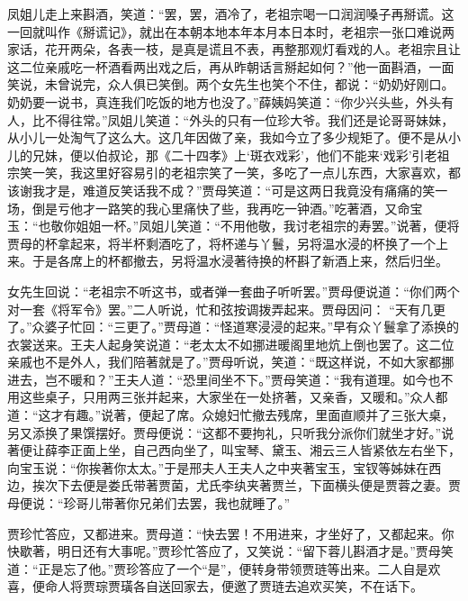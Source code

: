 \begin{parag}


    凤姐儿走上来斟酒，笑道：“罢，罢，酒冷了，老祖宗喝一口润润嗓子再掰谎。这一回就叫作《掰谎记》，就出在本朝本地本年本月本日本时，老祖宗一张口难说两家话，花开两朵，各表一枝，是真是谎且不表，再整那观灯看戏的人。老祖宗且让这二位亲戚吃一杯酒看两出戏之后，再从昨朝话言掰起如何？”他一面斟酒，一面笑说，未曾说完，众人俱已笑倒。两个女先生也笑个不住，都说：“奶奶好刚口。奶奶要一说书，真连我们吃饭的地方也没了。”薛姨妈笑道：“你少兴头些，外头有人，比不得往常。”凤姐儿笑道：“外头的只有一位珍大爷。我们还是论哥哥妹妹，从小儿一处淘气了这么大。这几年因做了亲，我如今立了多少规矩了。便不是从小儿的兄妹，便以伯叔论，那《二十四孝》上‘斑衣戏彩’，他们不能来‘戏彩’引老祖宗笑一笑，我这里好容易引的老祖宗笑了一笑，多吃了一点儿东西，大家喜欢，都该谢我才是，难道反笑话我不成？”贾母笑道：“可是这两日我竟没有痛痛的笑一场，倒是亏他才一路笑的我心里痛快了些，我再吃一钟酒。”吃著酒，又命宝玉：“也敬你姐姐一杯。”凤姐儿笑道：“不用他敬，我讨老祖宗的寿罢。”说著，便将贾母的杯拿起来，将半杯剩酒吃了，将杯递与丫鬟，另将温水浸的杯换了一个上来。于是各席上的杯都撤去，另将温水浸著待换的杯斟了新酒上来，然后归坐。
\end{parag}


\begin{parag}


    女先生回说：“老祖宗不听这书，或者弹一套曲子听听罢。”贾母便说道：“你们两个对一套《将军令》罢。”二人听说，忙和弦按调拨弄起来。贾母因问： “天有几更了。”众婆子忙回：“三更了。”贾母道：“怪道寒浸浸的起来。”早有众丫鬟拿了添换的衣裳送来。王夫人起身笑说道：“老太太不如挪进暖阁里地炕上倒也罢了。这二位亲戚也不是外人，我们陪著就是了。”贾母听说，笑道：“既这样说，不如大家都挪进去，岂不暖和？”王夫人道：“恐里间坐不下。”贾母笑道：“我有道理。如今也不用这些桌子，只用两三张并起来，大家坐在一处挤著，又亲香，又暖和。”众人都道：“这才有趣。”说著，便起了席。众媳妇忙撤去残席，里面直顺并了三张大桌，另又添换了果馔摆好。贾母便说：“这都不要拘礼，只听我分派你们就坐才好。”说著便让薛李正面上坐，自己西向坐了，叫宝琴、黛玉、湘云三人皆紧依左右坐下，向宝玉说：“你挨著你太太。”于是邢夫人王夫人之中夹著宝玉，宝钗等姊妹在西边，挨次下去便是娄氏带著贾菌，尤氏李纨夹著贾兰，下面横头便是贾蓉之妻。贾母便说：“珍哥儿带著你兄弟们去罢，我也就睡了。”
\end{parag}


\begin{parag}


    贾珍忙答应，又都进来。贾母道：“快去罢！不用进来，才坐好了，又都起来。你快歇著，明日还有大事呢。”贾珍忙答应了，又笑说：“留下蓉儿斟酒才是。”贾母笑道：“正是忘了他。”贾珍答应了一个“是”，便转身带领贾琏等出来。二人自是欢喜，便命人将贾琮贾璜各自送回家去，便邀了贾琏去追欢买笑，不在话下。
\end{parag}


